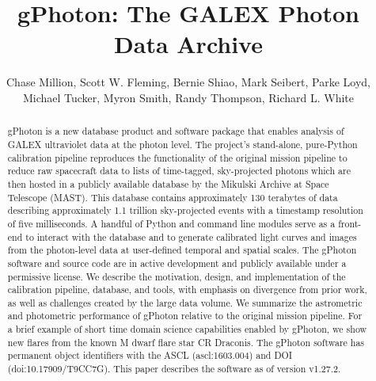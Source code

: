 \documentclass[preprint]{aastex}
\begin{document}
\title{gPhoton: The GALEX Photon Data Archive}

\author{
  Chase Million,
  Scott W. Fleming,
  Bernie Shiao,
  Mark Seibert,
  Parke Loyd,
  Michael Tucker,
  Myron Smith,
  Randy Thompson,
  Richard L. White
}



\begin{abstract}
gPhoton is a new database product and software package that enables analysis of GALEX ultraviolet data at the photon level. The project's stand-alone, pure-Python calibration pipeline reproduces the functionality of the original mission pipeline to reduce raw spacecraft data to lists of time-tagged, sky-projected photons which are then hosted in a publicly available database by the Mikulski Archive at Space Telescope (MAST). This database contains approximately 130 terabytes of data describing approximately 1.1 trillion sky-projected events with a timestamp resolution of five milliseconds. A handful of Python and command line modules serve as a front-end to interact with the database and to generate calibrated light curves and images from the photon-level data at user-defined temporal and spatial scales. The gPhoton software and source code are in active development and publicly available under a permissive license. We describe the motivation, design, and implementation of the calibration pipeline, database, and tools, with emphasis on divergence from prior work, as well as challenges created by the large data volume. We summarize the astrometric and photometric performance of gPhoton relative to the original mission pipeline. For a brief example of short time domain science capabilities enabled by gPhoton, we show new flares from the known M dwarf flare star CR Draconis. The gPhoton software has permanent object identifiers with the ASCL (ascl:1603.004) and DOI (doi:10.17909/T9CC7G).  This paper describes the software as of version v1.27.2.
\end{abstract}
\end{document}
